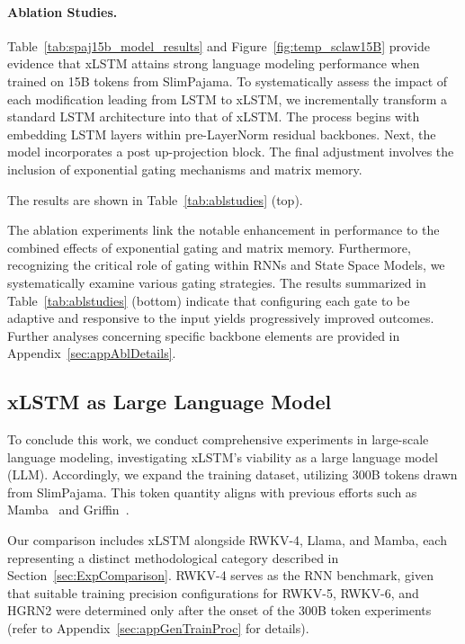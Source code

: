 \paragraph{Ablation Studies.}
Table~\ref{tab:spaj15b_model_results} and Figure~\ref{fig:temp_sclaw15B} provide evidence that xLSTM attains strong language modeling performance when trained on 15B tokens from SlimPajama. To systematically assess the impact of each modification leading from LSTM to xLSTM, we incrementally transform a standard LSTM architecture into that of xLSTM. The process begins with embedding LSTM layers within pre-LayerNorm residual backbones. Next, the model incorporates a post up-projection block. The final adjustment involves the inclusion of exponential gating mechanisms and matrix memory.

The results are shown in Table~\ref{tab:ablstudies} (top). 

The ablation experiments link the notable enhancement in performance to the combined effects of exponential gating and matrix memory. Furthermore, recognizing the critical role of gating within RNNs and State Space Models, we systematically examine various gating strategies. The results summarized in Table~\ref{tab:ablstudies} (bottom) indicate that configuring each gate to be adaptive and responsive to the input yields progressively improved outcomes. Further analyses concerning specific backbone elements are provided in Appendix~\ref{sec:appAblDetails}.

\subsection{xLSTM as Large Language Model}
\label{sec:ExpLanguage}

To conclude this work, we conduct comprehensive experiments in large-scale language modeling, investigating xLSTM's viability as a large language model (LLM). Accordingly, we expand the training dataset, utilizing 300B tokens drawn from SlimPajama. This token quantity aligns with previous efforts such as Mamba~\citep{Gu:24arxiv} and Griffin~\citep{De:24arxiv}.

Our comparison includes xLSTM alongside RWKV-4, Llama, and Mamba, each representing a distinct methodological category described in Section~\ref{sec:ExpComparison}. RWKV-4 serves as the RNN benchmark, given that suitable training precision configurations for RWKV-5, RWKV-6, and HGRN2 were determined only after the onset of the 300B token experiments (refer to Appendix~\ref{sec:appGenTrainProc} for details).

